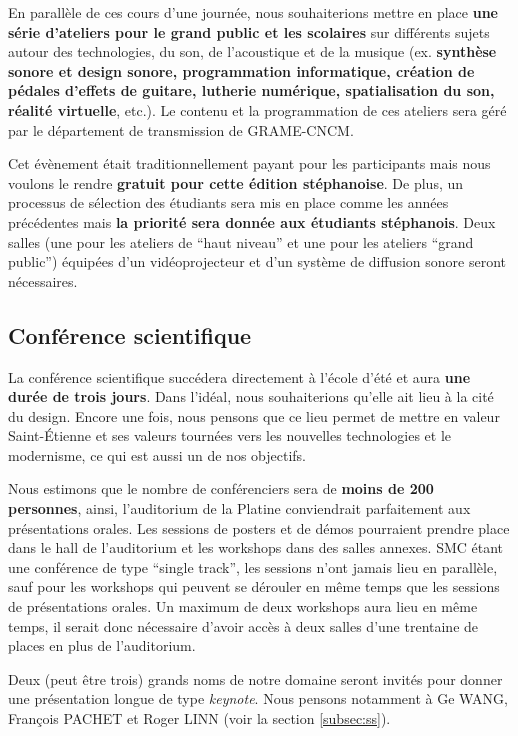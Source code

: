 \documentclass[fontsize=12pt]{scrartcl} %
\numberwithin{equation}{section} %
\numberwithin{figure}{section} %
\numberwithin{table}{section} %
\begin{document}
En parallèle de ces cours d'une journée, nous souhaiterions mettre en place \textbf{une série d'ateliers pour le grand public et les scolaires} sur différents sujets autour des technologies, du son, de l'acoustique et de la musique (ex. \textbf{synthèse sonore et design sonore, programmation informatique, création de pédales d'effets de guitare, lutherie numérique, spatialisation du son, réalité virtuelle}, etc.). Le contenu et la programmation de ces ateliers sera géré par le département de transmission de GRAME-CNCM. 

Cet évènement était traditionnellement payant pour les participants mais nous voulons le rendre \textbf{gratuit pour cette édition stéphanoise}. De plus, un processus de sélection des étudiants sera mis en place comme les années précédentes mais \textbf{la priorité sera donnée aux étudiants stéphanois}. Deux salles (une pour les ateliers de ``haut niveau'' et une pour les ateliers ``grand public'') équipées d'un vidéoprojecteur et d'un système de diffusion sonore seront nécessaires.

\subsection{Conférence scientifique}

La conférence scientifique succédera directement à l'école d'été et aura \textbf{une durée de trois jours}. Dans l'idéal, nous souhaiterions qu'elle ait lieu à la cité du design. Encore une fois, nous pensons que ce lieu permet de mettre en valeur Saint-Étienne et ses valeurs tournées vers les nouvelles technologies et le modernisme, ce qui est aussi un de nos objectifs. 

Nous estimons que le nombre de conférenciers sera de \textbf{moins de 200 personnes}, ainsi, l'auditorium de la Platine conviendrait parfaitement aux présentations orales. Les sessions de posters et de démos pourraient prendre place dans le hall de l'auditorium et les workshops dans des salles annexes. SMC étant une conférence de type ``single track'', les sessions n'ont jamais lieu en parallèle, sauf pour les workshops qui peuvent se dérouler en même temps que les sessions de présentations orales. Un maximum de deux workshops aura lieu en même temps, il serait donc nécessaire d'avoir accès à deux salles d'une trentaine de places en plus de l'auditorium.

Deux (peut être trois) grands noms de notre domaine seront invités pour donner une présentation longue de type \textit{keynote}. Nous pensons notamment à Ge WANG, François PACHET et Roger LINN (voir la section \ref{subsec:ss}).
\end{document}
